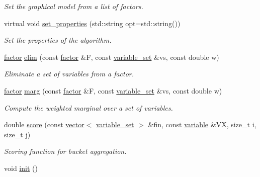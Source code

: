 \begin{DoxyCompactItemize}
\begin{DoxyCompactList}\small\item\em Set the graphical model from a list of factors. \end{DoxyCompactList}\item 
virtual void \hyperlink{classmerlin_1_1wmb_aa8868851a3f7c8d1c43326f431bd1132}{set\+\_\+properties} (std\+::string opt=std\+::string())
\begin{DoxyCompactList}\small\item\em Set the properties of the algorithm. \end{DoxyCompactList}\item 
\hyperlink{classmerlin_1_1factor}{factor} \hyperlink{classmerlin_1_1wmb_a9acbede3a21446ef005eaae637ec344e}{elim} (const \hyperlink{classmerlin_1_1factor}{factor} \&F, const \hyperlink{classmerlin_1_1variable__set}{variable\+\_\+set} \&vs, const double w)
\begin{DoxyCompactList}\small\item\em Eliminate a set of variables from a factor. \end{DoxyCompactList}\item 
\hyperlink{classmerlin_1_1factor}{factor} \hyperlink{classmerlin_1_1wmb_a6abd46dbb20aa12ef7b2bfa93cefc36d}{marg} (const \hyperlink{classmerlin_1_1factor}{factor} \&F, const \hyperlink{classmerlin_1_1variable__set}{variable\+\_\+set} \&vs, const double w)
\begin{DoxyCompactList}\small\item\em Compute the weighted marginal over a set of variables. \end{DoxyCompactList}\item 
double \hyperlink{classmerlin_1_1wmb_aa4cadd87c907327227427ba1f9555350}{score} (const \hyperlink{classmerlin_1_1vector}{vector}$<$ \hyperlink{classmerlin_1_1variable__set}{variable\+\_\+set} $>$ \&fin, const \hyperlink{classmerlin_1_1variable}{variable} \&V\+X, size\+\_\+t i, size\+\_\+t j)
\begin{DoxyCompactList}\small\item\em Scoring function for bucket aggregation. \end{DoxyCompactList}\item 
\hypertarget{classmerlin_1_1wmb_ac9a83bcbef3f06a48d6cd9bea8ad3ce6}{}void \hyperlink{classmerlin_1_1wmb_ac9a83bcbef3f06a48d6cd9bea8ad3ce6}{init} ()\label{classmerlin_1_1wmb_ac9a83bcbef3f06a48d6cd9bea8ad3ce6}


\end{DoxyCompactItemize}
